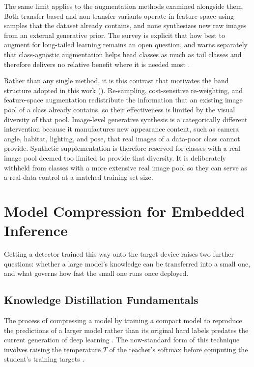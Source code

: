 The same limit applies to the augmentation methods examined alongside them. Both transfer-based and non-transfer variants operate in feature space using samples that the dataset already contains, and none synthesizes new raw images from an external generative prior. The survey is explicit that how best to augment for long-tailed learning remains an open question, and warns separately that class-agnostic augmentation helps head classes as much as tail classes and therefore delivers no relative benefit where it is needed most \cite{zhangDeepLongTailedLearning2023}.

Rather than any single method, it is this contrast that motivates the band structure adopted in this work (). Re-sampling, cost-sensitive re-weighting, and feature-space augmentation redistribute the information that an existing image pool of a class already contains, so their effectiveness is limited by the visual diversity of that pool. Image-level generative synthesis is a categorically different intervention because it manufactures new appearance content, such as camera angle, habitat, lighting, and pose, that real images of a data-poor class cannot provide. Synthetic supplementation is therefore reserved for classes with a real image pool deemed too limited to provide that diversity. It is deliberately withheld from classes with a more extensive real image pool so they can serve as a real-data control at a matched training set size.

\section{Model Compression for Embedded Inference}\label{sec:lit_kd_and_embedded}

Getting a detector trained this way onto the target device raises two further questions: whether a large model's knowledge can be transferred into a small one, and what governs how fast the small one runs once deployed.

\subsection{Knowledge Distillation Fundamentals}\label{sec:lit_knowledge_distillation}

The process of compressing a model by training a compact model to reproduce the predictions of a larger model rather than its original hard labels predates the current generation of deep learning \cite{buciluaModelCompression2006}. The now-standard form of this technique involves raising the temperature $T$ of the teacher's softmax before computing the student's training targets \cite{hintonDistillingKnowledgeNeural2015}.

